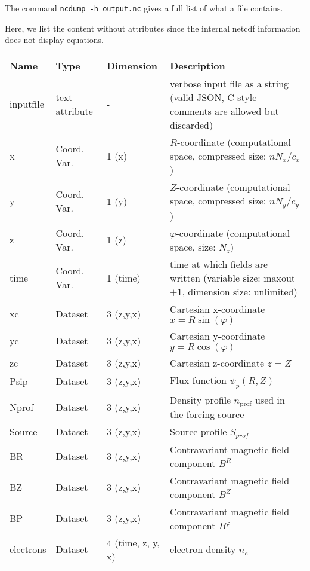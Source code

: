 \begin{tcolorbox}[title=Note]
    The command \texttt{ncdump -h output.nc} gives a full list of what a file contains.
\end{tcolorbox}
Here, we list the content without attributes
since the internal netcdf information does not display equations.
%
\begin{longtable}{lll>{\RaggedRight}p{7cm}}
\toprule
\rowcolor{gray!50}\textbf{Name} &  \textbf{Type} & \textbf{Dimension} & \textbf{Description}  \\ \midrule
inputfile  &     text attribute & - & verbose input file as a string (valid JSON, C-style comments are allowed but discarded) \\
x                & Coord. Var. & 1 (x) & $R$-coordinate (computational space, compressed size: $nN_x/c_x$)\\
y                & Coord. Var. & 1 (y) & $Z$-coordinate (computational space, compressed size: $nN_y/c_y$)\\
z                & Coord. Var. & 1 (z) & $\varphi$-coordinate (computational space, size: $N_z$) \\
time             & Coord. Var. & 1 (time)& time at which fields are written (variable size: maxout$+1$, dimension size: unlimited) \\
xc           & Dataset & 3 (z,y,x) & Cartesian x-coordinate $x=R\sin(\varphi)$ \\
yc           & Dataset & 3 (z,y,x) & Cartesian y-coordinate $y=R\cos(\varphi)$\\
zc           & Dataset & 3 (z,y,x) & Cartesian z-coordinate $z=Z$ \\
Psip             & Dataset & 3 (z,y,x) & Flux function $\psi_p(R,Z)$ \\
Nprof            & Dataset & 3 (z,y,x) & Density profile $n_\text{prof}$ used in the forcing source \\
Source           & Dataset & 3 (z,y,x) & Source profile $S_{prof}$\\
BR               & Dataset & 3 (z,y,x) & Contravariant magnetic field component $B^R$ \\
BZ               & Dataset & 3 (z,y,x) & Contravariant magnetic field component $B^Z$ \\
BP               & Dataset & 3 (z,y,x) & Contravariant magnetic field component $B^\varphi$ \\
electrons        & Dataset & 4 (time, z, y, x) & electron density $n_e$ \\

\end{longtable}
